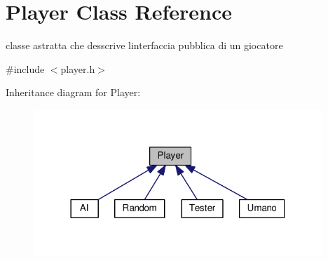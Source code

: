 \hypertarget{classPlayer}{}\section{Player Class Reference}
\label{classPlayer}


classe astratta che desscrive l\textquotesingle{}interfaccia pubblica di un giocatore  




{\ttfamily \#include $<$player.\+h$>$}



Inheritance diagram for Player\+:
\nopagebreak
\begin{figure}[H]
\begin{center}
\leavevmode
\includegraphics[width=309pt]{classPlayer__inherit__graph}
\end{center}
\end{figure}
